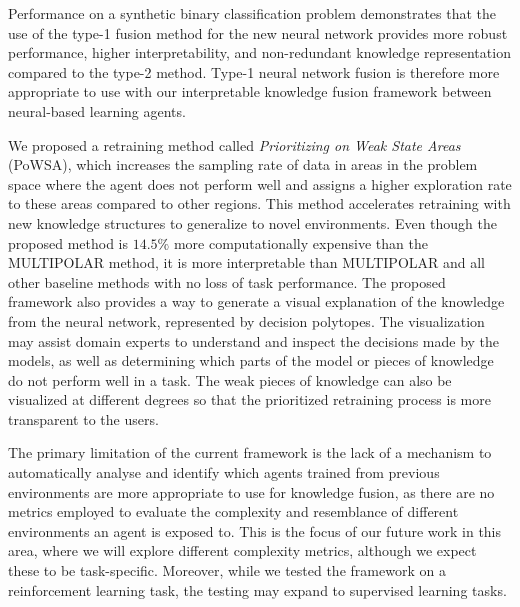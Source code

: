 \documentclass[lettersize,journal]{IEEEtran}
\begin{document}
Performance on a synthetic binary classification problem demonstrates that the use of the type-1 fusion method for the new neural network provides more robust performance, higher interpretability, and non-redundant knowledge representation compared to the type-2 method. Type-1 neural network fusion is therefore more appropriate to use with our interpretable knowledge fusion framework between neural-based learning agents.

We proposed a retraining method called \textit{Prioritizing on Weak State Areas} (PoWSA), which increases the sampling rate of data in areas in the problem space where the agent does not perform well and assigns a higher exploration rate to these areas compared to other regions. This method accelerates retraining with new knowledge structures to generalize to novel environments. Even though the proposed method is $14.5\%$ more computationally expensive than the MULTIPOLAR method, it is more interpretable than MULTIPOLAR and all other baseline methods with no loss of task performance. The proposed framework also provides a way to generate a visual explanation of the knowledge from the neural network, represented by decision polytopes. The visualization may assist domain experts to understand and inspect the decisions made by the models, as well as determining which parts of the model or pieces of knowledge do not perform well in a task. The weak pieces of knowledge can also be visualized at different degrees so that the prioritized retraining process is more transparent to the users.

The primary limitation of the current framework is the lack of a mechanism to automatically analyse and identify which agents trained from previous environments are more appropriate to use for knowledge fusion, as there are no metrics employed to evaluate the complexity and resemblance of different environments an agent is exposed to. This is the focus of our future work in this area, where we will explore different complexity metrics, although we expect these to be task-specific. Moreover, while we tested the framework on a reinforcement learning task, the testing may expand to supervised learning tasks.

%
\end{document}
